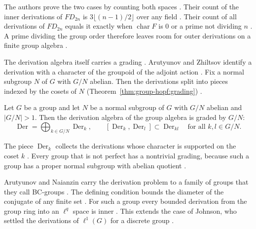 The authors prove the two cases by counting both spaces \cite[Theorem~3.5,
p.~10]{ManjuSharma2026}. Their count of the inner derivations of $FD_{2n}$ is
$3\lfloor (n-1)/2\rfloor$ over any field \cite[Theorem~3.5,
p.~10]{ManjuSharma2026}. Their count of all derivations of $FD_{2n}$ equals it
exactly when $\operatorname{char}F$ is $0$ or a prime not dividing $n$
\cite[Theorem~3.3, p.~7]{ManjuSharma2026}. A prime dividing the group order
therefore leaves room for outer derivations on a finite group algebra
\cite[Corollary~3.6, p.~10]{ManjuSharma2026}.

The derivation algebra itself carries a grading
\cite[p.~1]{ArutyunovZhiltsov2023}. Arutyunov and Zhiltsov identify a
derivation with a character of the groupoid of the adjoint action
\cite[p.~1]{ArutyunovZhiltsov2023}. Fix a normal subgroup $N$ of $G$ with
$G/N$ abelian. Then the derivations split into pieces indexed by the cosets of
$N$ (Theorem~\ref{thm:group-hopf:grading}) \cite[p.~1]{ArutyunovZhiltsov2023}.

\begin{theorem}\label{thm:group-hopf:grading}
Let $G$ be a group and let $N$ be a normal subgroup of $G$ with $G/N$
abelian and $|G/N|>1$. Then the derivation algebra of the group algebra is
graded by $G/N$:
\[
\operatorname{Der}=\bigoplus_{k\in G/N}\operatorname{Der}_{k},
\qquad
[\operatorname{Der}_{k},\operatorname{Der}_{l}]\subset\operatorname{Der}_{kl}
\quad\text{for all }k,l\in G/N .
\]
\end{theorem}

The piece $\operatorname{Der}_{k}$ collects the derivations whose character
is supported on the coset $k$ \cite[p.~1]{ArutyunovZhiltsov2023}. Every
group that is not perfect has a nontrivial grading, because such a group has
a proper normal subgroup with abelian quotient
\cite[p.~1]{ArutyunovZhiltsov2023}.

Arutyunov and Naianzin carry the derivation problem to a family of groups
that they call BC-groups \cite[p.~2]{ArutyunovNaianzin2023}. The defining
condition bounds the diameter of the conjugate of any finite set
\cite[p.~2]{ArutyunovNaianzin2023}. For such a group every bounded
derivation from the group ring into an $\ell^{q}$ space is inner
\cite[Theorem~2, p.~2]{ArutyunovNaianzin2023}. This extends the case of
Johnson, who settled the derivations of $\ell^{1}(G)$ for a discrete group
\cite[p.~2]{ArutyunovNaianzin2023}.

